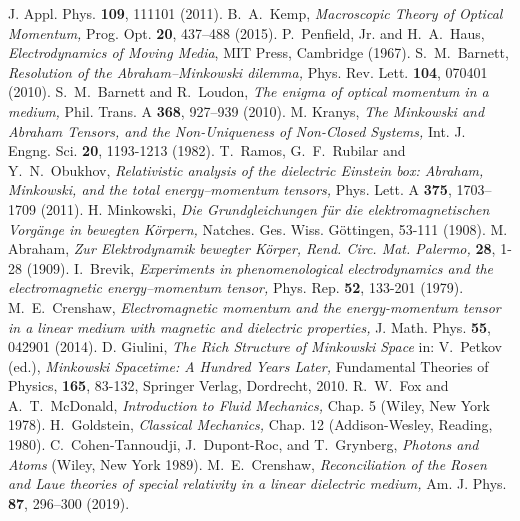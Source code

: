 \documentclass[twocolumn,amssymb,eqsecnum,aps,pra]{revtex4-2}
\begin{document}
\begin{thebibliography}{1}
J. Appl. Phys. 
\textbf{109}, 111101 (2011).
B.~A.~Kemp, 
\textit{Macroscopic {T}heory of {O}ptical {M}omentum,}
Prog. Opt. 
\textbf{20}, 437--488 (2015).
P.~Penfield, Jr. and H.~A.~Haus, 
\textit{Electrodynamics of {M}oving {M}edia}, 
MIT Press, Cambridge (1967).
S.~M.~Barnett, 
\textit{Resolution of the {A}braham--{M}inkowski dilemma,}
Phys. Rev. Lett. 
\textbf{104}, 070401 (2010).
S.~M.~Barnett and R.~Loudon, 
\textit{The enigma of optical momentum in a medium,}
Phil. Trans. A 
\textbf{368}, 927--939 (2010).
M. Kranys, 
\textit{The {M}inkowski and {A}braham {T}ensors, and the {N}on-{U}niqueness of {N}on-{C}losed {S}ystems,}
Int. J. Engng. Sci.
\textbf{20}, 1193-1213 (1982).
T.~Ramos, G.~F.~Rubilar and Y.~N.~Obukhov, 
\textit{Relativistic analysis of the dielectric {E}instein box: {A}braham, {M}inkowski, and the total energy--momentum tensors,}
Phys. Lett. A
\textbf{375}, 1703--1709 (2011).
H. Minkowski, 
\textit{Die {G}rundgleichungen f\"ur die elektromagnetischen {V}org\"ange in bewegten {K}\"orpern,}
Natches. Ges. Wiss. G\"ottingen, 53-111 (1908).
M. Abraham, 
\textit{Zur {E}lektrodynamik bewegter {K}\"orper, 
Rend. Circ. Mat. Palermo,}
\textbf{28}, 1-28 (1909).
I.~Brevik, 
\textit{Experiments in phenomenological electrodynamics and the electromagnetic energy--momentum tensor,}
Phys. Rep. 
\textbf{52}, 133-201 (1979).
M.~E.~Crenshaw,
\textit{Electromagnetic momentum and the energy-momentum tensor in a linear medium with magnetic and dielectric properties,}
J. Math. Phys.
\textbf{55}, 042901 (2014).
D. Giulini, \textit{The {R}ich {S}tructure of {M}inkowski {S}pace}
in: V.~Petkov (ed.),
\textit{Minkowski Spacetime: A Hundred Years Later,}
Fundamental Theories of Physics,
\textbf{165}, 83-132, Springer Verlag, Dordrecht, 2010.
R.~W.~Fox and A.~T.~McDonald,
\textit{Introduction to {F}luid {M}echanics,} Chap. 5
(Wiley, New York 1978).
H.~Goldstein,
\textit{Classical {M}echanics,} Chap. 12
(Addison-Wesley, Reading, 1980).
C.~Cohen-Tannoudji, J.~Dupont-Roc, and T.~Grynberg,
\textit{Photons and {A}toms}
(Wiley, New York 1989).
M.~E.~Crenshaw,
\textit{Reconciliation of the {R}osen and {L}aue theories of special relativity in a linear dielectric medium,}
Am. J. Phys.
\textbf{87}, 296--300 (2019).

\end{thebibliography}
\end{document}
